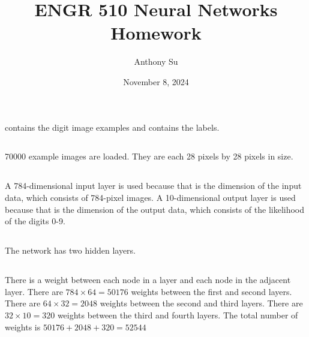 \documentclass[11pt]{article}
\title{ENGR 510 Neural Networks Homework}
\author{Anthony Su}
\date{November 8, 2024}
\begin{document}
\thispagestyle{plain}
\maketitle


\subsection{}  %
 contains the digit image examples and  contains
the labels.

\subsection{}  %
70000 example images are loaded. They are each 28 pixels by 28 pixels in size.

\subsection{}  %
A 784-dimensional input layer is used because that is the dimension of the input
data, which consists of 784-pixel images. A 10-dimensional output layer is used
because that is the dimension of the output data, which consists of the
likelihood of the digits 0-9.

\subsection{}  %
The network has two hidden layers.

\subsection{}  %
There is a weight between each node in a layer and each node in the adjacent
layer. There are $784 \times 64 = 50176$ weights between the first and second
layers. There are $64 \times 32 = 2048$ weights between the second and third
layers. There are $32 \times 10 = 320$ weights between the third and fourth
layers. The total number of weights is $50176 + 2048 + 320 = 52544$
\end{document}

